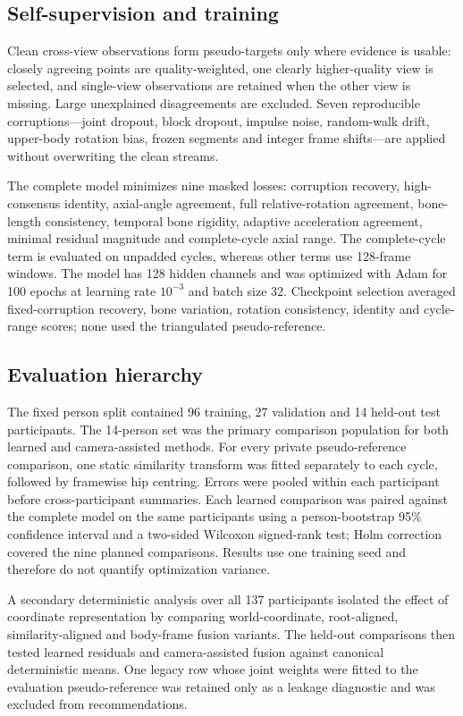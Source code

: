 \documentclass[lineno,pdflatex,sn-mathphys-num]{sn-jnl}
\begin{document}
\subsection{Self-supervision and training}

Clean cross-view observations form pseudo-targets only where evidence is
usable: closely agreeing points are quality-weighted, one clearly higher-quality
view is selected, and single-view observations are retained when the other view
is missing. Large unexplained disagreements are excluded. Seven reproducible
corruptions---joint dropout, block dropout, impulse noise, random-walk drift,
upper-body rotation bias, frozen segments and integer frame shifts---are
applied without overwriting the clean streams.

The complete model minimizes nine masked losses: corruption recovery,
high-consensus identity, axial-angle agreement, full relative-rotation
agreement, bone-length consistency, temporal bone rigidity, adaptive
acceleration agreement, minimal residual magnitude and complete-cycle axial
range. The complete-cycle term is evaluated on unpadded cycles, whereas other
terms use 128-frame windows. The model has 128 hidden channels and was optimized
with Adam for 100 epochs at learning rate $10^{-3}$ and batch size 32.
Checkpoint selection averaged fixed-corruption recovery, bone variation,
rotation consistency, identity and cycle-range scores; none used the
triangulated pseudo-reference.

\subsection{Evaluation hierarchy}

The fixed person split contained 96 training, 27 validation and 14 held-out
test participants. The 14-person set was the primary comparison population for
both learned and camera-assisted methods. For every private pseudo-reference
comparison, one static similarity transform was
fitted separately to each cycle, followed by framewise hip centring. Errors
were pooled within each participant before cross-participant summaries. Each
learned comparison was paired against the complete model on the
same participants using a person-bootstrap 95\% confidence interval and a
two-sided Wilcoxon signed-rank test; Holm correction covered the nine planned
comparisons. Results use one training seed and therefore do not quantify
optimization variance.

A secondary deterministic analysis over all 137 participants isolated the
effect of coordinate representation by comparing world-coordinate,
root-aligned, similarity-aligned and body-frame fusion variants. The held-out
comparisons then tested learned residuals and camera-assisted fusion against
canonical deterministic means. One legacy row whose joint weights were fitted
to the evaluation pseudo-reference was retained only as a leakage diagnostic
and was excluded from recommendations.
\end{document}
